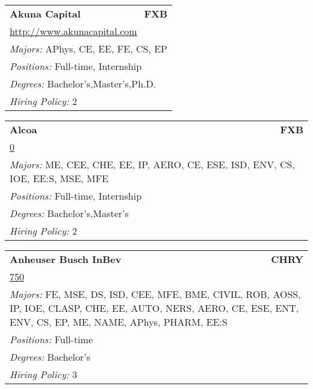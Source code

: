 \documentclass[twoside]{article}
\begin{document}
\begin{center}
\begin{multicols}{3}
\begin{FlushLeft}
\begin{minipage}{.9\columnwidth}
\end{minipage}
 
\begin{minipage}{.9\columnwidth}\begin{tabularx}{.95\columnwidth}{Xr}
                 {\Large\bf Akuna Capital} & {\Large\bf FXB}\\
    \multicolumn{2}{p{.95\columnwidth}}{\url{http://www.akunacapital.com}}\\
    \multicolumn{2}{p{.95\columnwidth}}{\emph{Majors:} APhys, CE, EE, FE, CS, EP}\\
    \multicolumn{2}{p{.95\columnwidth}}{\emph{Positions:} Full-time, Internship}\\
    \multicolumn{2}{p{.95\columnwidth}}{\emph{Degrees:} Bachelor's,Master's,Ph.D.}\\
    \multicolumn{2}{p{.95\columnwidth}}{\emph{Hiring Policy:} 2}\\
    \end{tabularx}
    
\end{minipage}
 
\begin{minipage}{.9\columnwidth}\begin{tabularx}{.95\columnwidth}{Xr}
                 {\Large\bf Alcoa} & {\Large\bf FXB}\\
    \multicolumn{2}{p{.95\columnwidth}}{\url{0}}\\
    \multicolumn{2}{p{.95\columnwidth}}{\emph{Majors:} ME, CEE, CHE, EE, IP, AERO, CE, ESE, ISD, ENV, CS, IOE, EE:S, MSE, MFE}\\
    \multicolumn{2}{p{.95\columnwidth}}{\emph{Positions:} Full-time, Internship}\\
    \multicolumn{2}{p{.95\columnwidth}}{\emph{Degrees:} Bachelor's,Master's}\\
    \multicolumn{2}{p{.95\columnwidth}}{\emph{Hiring Policy:} 2}\\
    \end{tabularx}
    
\end{minipage}
 
\begin{minipage}{.9\columnwidth}\begin{tabularx}{.95\columnwidth}{Xr}
                 {\Large\bf Anheuser Busch InBev} & {\Large\bf CHRY}\\
    \multicolumn{2}{p{.95\columnwidth}}{\url{750}}\\
    \multicolumn{2}{p{.95\columnwidth}}{\emph{Majors:} FE, MSE, DS, ISD, CEE, MFE, BME, CIVIL, ROB, AOSS, IP, IOE, CLASP, CHE, EE, AUTO, NERS, AERO, CE, ESE, ENT, ENV, CS, EP, ME, NAME, APhys, PHARM, EE:S}\\
    \multicolumn{2}{p{.95\columnwidth}}{\emph{Positions:} Full-time}\\
    \multicolumn{2}{p{.95\columnwidth}}{\emph{Degrees:} Bachelor's}\\
    \multicolumn{2}{p{.95\columnwidth}}{\emph{Hiring Policy:} 3}\\
    \end{tabularx}
    

\end{minipage}
\end{FlushLeft}
\end{multicols}
\end{center}
\end{document}
